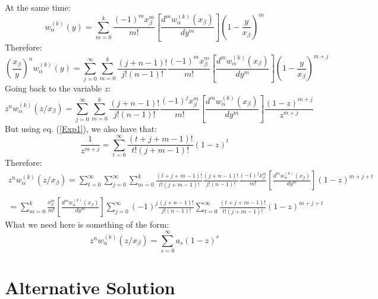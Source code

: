 \documentclass[10pt,a4paper]{article}
\begin{document}
At the same time:
\begin{equation}
w_{\alpha}^{(k)}(y) = \sum_{m=0}^k\frac{(-1)^mx_\beta^m}{m!} \left[\frac{d^m w_\alpha^{(k)}(x_\beta)}{dy^m}\right]\left(1-\frac{y}{x_\beta}\right)^m
\end{equation}
Therefore:
\begin{equation}
\left(\frac{x_\beta}{y}\right)^n w_{\alpha}^{(k)}(y) = \sum_{j=0}^\infty\sum_{m=0}^k\frac{(j+n-1)!}{j!(n-1)!}\frac{(-1)^mx_\beta^m}{m!} \left[\frac{d^m w_\alpha^{(k)}(x_\beta)}{dy^m}\right]\left(1-\frac{y}{x_\beta}\right)^{m+j}
\end{equation}
Going back to the variable $z$:
\begin{equation}
z^n w_{\alpha}^{(k)}(z/x_\beta) =
\sum_{j=0}^\infty\sum_{m=0}^k\frac{(j+n-1)!}{j!(n-1)!}\frac{(-1)^jx_\beta^m}{m!}
\left[\frac{d^m w_\alpha^{(k)}(x_\beta)}{dy^m}\right] \frac{(1-z)^{m+j}}{z^{m+j}}
\end{equation}
But using eq. (\ref{Exp1}), we also have that:
\begin{equation}\label{mimmo}
\frac{1}{z^{m+j}}=\sum_{t=0}^{\infty}\frac{(t+j+m-1)!}{t!(j+m-1)!}(1-z)^t
\end{equation}
Therefore:
\begin{equation}
\begin{array}{c}
\displaystyle z^n w_{\alpha}^{(k)}(z/x_\beta) =
\sum_{t=0}^{\infty}\sum_{j=0}^\infty\sum_{m=0}^k \frac{(t+j+m-1)!}{t!(j+m-1)!}\frac{(j+n-1)!}{j!(n-1)!}\frac{(-1)^jx_\beta^m}{m!}
\left[\frac{d^m w_\alpha^{(k)}(x_\beta)}{dy^m}\right] (1-z)^{m+j+t}\\
\\
\displaystyle = \sum_{m=0}^k \frac{x_\beta^m}{m!}
\left[\frac{d^m w_\alpha^{(k)}(x_\beta)}{dy^m}\right]
\sum_{j=0}^\infty (-1)^j\frac{(j+n-1)!}{j!(n-1)!} \sum_{t=0}^{\infty} \frac{(t+j+m-1)!}{t!(j+m-1)!}(1-z)^{m+j+t}
\end{array}
\end{equation}
What we need here is something of the form:
\begin{equation}
\displaystyle z^n w_{\alpha}^{(k)}(z/x_\beta) =\sum_{s=0}^\infty a_s(1-z)^s
\end{equation}

\section{Alternative Solution}
\end{document}
